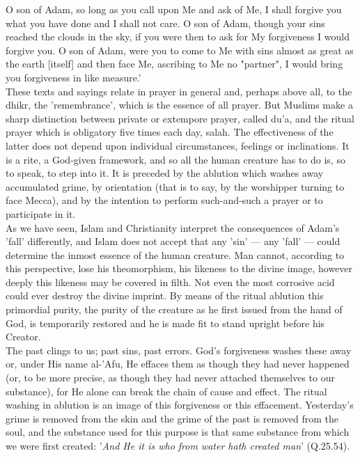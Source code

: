 \documentclass[11pt, b5paper, twoside]{book}
\begin{document}
O son of Adam, so long as you call upon Me and ask of Me, I shall forgive you what you have done and 
I shall not care. O son of Adam, though your sins reached the clouds in the sky, if you were then to 
ask for My forgiveness I would forgive you. O son of Adam, were you to come to Me with sins almost as 
great as the earth [itself] and then face Me, ascribing to Me no "partner", I would bring you 
forgiveness in like measure.' \\

These texts and sayings relate in prayer in general and, perhaps above all, to the dhikr, the 
'remembrance', which is the essence of all prayer. But Muslims make a sharp distinction between 
private or extempore prayer, called du'a, and the ritual prayer which is obligatory five times each 
day, salah. The effectiveness of the latter does not depend upon individual circumstances, feelings 
or inclinations. It is a rite, a God-given framework, and so all the human creature has to do is, so 
to speak, to step into it. It is preceded by the ablution which washes away accumulated grime, by 
orientation (that is to say, by the worshipper turning to face Mecca), and by the intention to 
perform such-and-such a prayer or to participate in it. \\

As we have seen, Islam and Christianity interpret the consequences of Adam's 'fall' differently, and 
Islam does not accept that any 'sin' --- any 'fall' --- could determine the inmost essence of the human 
creature. Man cannot, according to this perspective, lose his theomorphism, his likeness to the 
divine image, however deeply this likeness may be covered in filth. Not even the most corrosive acid 
could ever destroy the divine imprint. By means of the ritual ablution this primordial purity, the 
purity of the creature as he first issued from the hand of God, is temporarily restored and he is 
made fit to stand upright before his Creator. \\

The past clings to us; past sins, past errors. God's forgiveness washes these away or, under His name 
al-'Afu, He effaces them as though they had never happened (or, to be more precise, as though they 
had never attached themselves to our substance), for He alone can break the chain of cause and 
effect. The ritual washing in ablution is an image of this forgiveness or this effacement. 
Yesterday's grime is removed from the skin and the grime of the past is removed from the soul, and 
the substance used for this purpose is that same substance from which we were first created: '\emph{And He 
it is who from water hath created man}' (Q.25.54). \\
\end{document}

